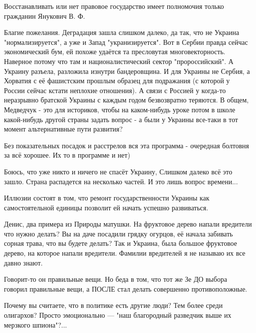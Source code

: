 \begin{itemize}
Восстанавливать или нет правовое государство имеет полномочия только гражданин Янукович В. Ф.


Благие пожелания. Деградация зашла слишком далеко, да так, что не Украина
"нормализируется", а уже и Запад "укранизируется". Вот в Сербии правда сейчас
экономический бум, ей похоже удаётся та пресловутая многовекторность. Наверное
потому что там и националистический сектор "пророссийский". А Украину разъела,
разложила изнутри бандеровщина. И для Украины не Сербия, а Хорватия с её
фашистским прошлым образец для подражания (с которой у России сейчас кстати
неплохие отношения). А связи с Россией у когда-то неразрывно братской Украины с
каждым годом безвозвратно теряются. В общем, Медведчук - это для историков,
чтобы на каком-нибудь уроке потом в школе какой-нибудь другой страны задать
вопрос - а были у Украины все-таки в тот момент альтернативные пути развития?



Без показательных посадок и расстрелов вся эта программа - очередная болтовня
за всё хорошее. Их то в программе и нет)



Боюсь, что уже никто и ничего не спасёт Украину, Слишком далеко всё это зашло.
Страна распадется на несколько частей. И это лишь вопрос времени...



Иллюзии состоят в том, что ремонт государственности Украины как самостоятельной
единицы позволит ей начать успешно развиваться.


Денис, два примера из Природы матушки. На фруктовое дерево напали вредители что
нужно делать? Вы на даче посадили грядку огурцов, её начала забивать сорная
трава, что вы будете делать? Так и Украина, была большое фруктовое дерево, на
которое напали вредители. Фамилии вредителей я не называю их все давно знают.


Говорит-то он правильные вещи. Но беда в том, что тот же Зе ДО выбора говорил
правильные вещи, а ПОСЛЕ стал делать совершенно противоположные.

Почему вы считаете, что в политике есть другие люди? Тем более среди олигархов?
Просто эмоционально — "наш благородный разведчик выше их мерзкого шпиона"?...



\end{itemize}
